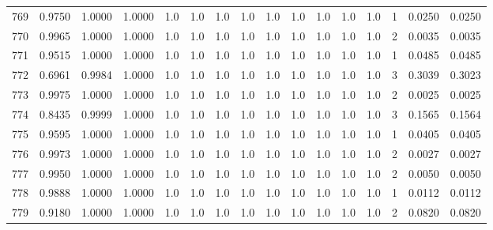 \begin{tabular}{lrrrrrrrrrrrrrrr}
769 &      0.9750 &  1.0000 &  1.0000 &     1.0 &     1.0 &     1.0 &     1.0 &     1.0 &     1.0 &     1.0 &      1.0 &        1.0 &      1 &                    0.0250 &                     0.0250 \\
770 &      0.9965 &  1.0000 &  1.0000 &     1.0 &     1.0 &     1.0 &     1.0 &     1.0 &     1.0 &     1.0 &      1.0 &        1.0 &      2 &                    0.0035 &                     0.0035 \\
771 &      0.9515 &  1.0000 &  1.0000 &     1.0 &     1.0 &     1.0 &     1.0 &     1.0 &     1.0 &     1.0 &      1.0 &        1.0 &      1 &                    0.0485 &                     0.0485 \\
772 &      0.6961 &  0.9984 &  1.0000 &     1.0 &     1.0 &     1.0 &     1.0 &     1.0 &     1.0 &     1.0 &      1.0 &        1.0 &      3 &                    0.3039 &                     0.3023 \\
773 &      0.9975 &  1.0000 &  1.0000 &     1.0 &     1.0 &     1.0 &     1.0 &     1.0 &     1.0 &     1.0 &      1.0 &        1.0 &      2 &                    0.0025 &                     0.0025 \\
774 &      0.8435 &  0.9999 &  1.0000 &     1.0 &     1.0 &     1.0 &     1.0 &     1.0 &     1.0 &     1.0 &      1.0 &        1.0 &      3 &                    0.1565 &                     0.1564 \\
775 &      0.9595 &  1.0000 &  1.0000 &     1.0 &     1.0 &     1.0 &     1.0 &     1.0 &     1.0 &     1.0 &      1.0 &        1.0 &      1 &                    0.0405 &                     0.0405 \\
776 &      0.9973 &  1.0000 &  1.0000 &     1.0 &     1.0 &     1.0 &     1.0 &     1.0 &     1.0 &     1.0 &      1.0 &        1.0 &      2 &                    0.0027 &                     0.0027 \\
777 &      0.9950 &  1.0000 &  1.0000 &     1.0 &     1.0 &     1.0 &     1.0 &     1.0 &     1.0 &     1.0 &      1.0 &        1.0 &      2 &                    0.0050 &                     0.0050 \\
778 &      0.9888 &  1.0000 &  1.0000 &     1.0 &     1.0 &     1.0 &     1.0 &     1.0 &     1.0 &     1.0 &      1.0 &        1.0 &      1 &                    0.0112 &                     0.0112 \\
779 &      0.9180 &  1.0000 &  1.0000 &     1.0 &     1.0 &     1.0 &     1.0 &     1.0 &     1.0 &     1.0 &      1.0 &        1.0 &      2 &                    0.0820 &                     0.0820 \\

\end{tabular}
